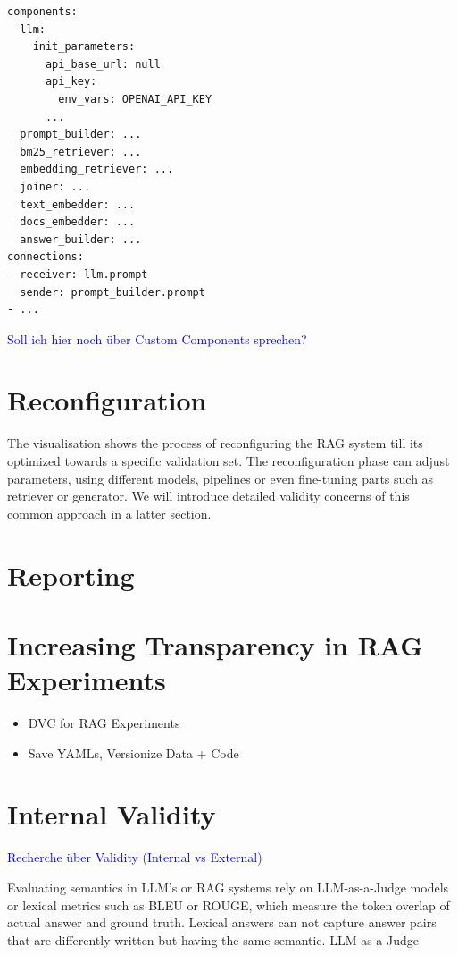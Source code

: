 \newpage
\begin{verbatim}
components:
  llm:
    init_parameters:
      api_base_url: null
      api_key:
        env_vars: OPENAI_API_KEY
      ...
  prompt_builder: ...
  bm25_retriever: ...
  embedding_retriever: ...
  joiner: ...
  text_embedder: ...
  docs_embedder: ...
  answer_builder: ...
connections:
- receiver: llm.prompt
  sender: prompt_builder.prompt
- ...
\end{verbatim}

\textcolor{blue}{Soll ich hier noch über Custom Components sprechen?}


\section{Reconfiguration}
The visualisation shows the process of reconfiguring the RAG system till its optimized towards a specific validation set. The reconfiguration phase can adjust parameters, using different models, pipelines or even fine-tuning parts such as retriever or generator. We will introduce detailed validity concerns of this common approach in a latter section. 

\section{Reporting}

\section{Increasing Transparency in RAG Experiments}

\begin{itemize}
    \item DVC for RAG Experiments
    \item Save YAMLs, Versionize Data + Code
\end{itemize}

\section{Internal Validity}

\textcolor{blue}{Recherche über Validity (Internal vs External)}


Evaluating semantics in LLM's or RAG systems rely on LLM-as-a-Judge models or lexical metrics such as BLEU or ROUGE, which measure the token overlap of actual answer and ground truth. Lexical answers can not capture answer pairs that are differently written but having the same semantic. LLM-as-a-Judge 

